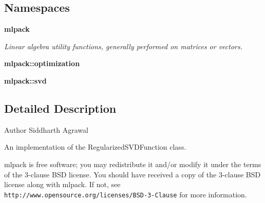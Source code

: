 \subsection*{Namespaces}
\begin{DoxyCompactItemize}
\item 
 {\bf mlpack}
\begin{DoxyCompactList}\small\item\em Linear algebra utility functions, generally performed on matrices or vectors. \end{DoxyCompactList}\item 
 {\bf mlpack\+::optimization}
\item 
 {\bf mlpack\+::svd}
\end{DoxyCompactItemize}


\subsection{Detailed Description}
\begin{DoxyAuthor}{Author}
Siddharth Agrawal
\end{DoxyAuthor}
An implementation of the Regularized\+S\+V\+D\+Function class.

mlpack is free software; you may redistribute it and/or modify it under the terms of the 3-\/clause B\+SD license. You should have received a copy of the 3-\/clause B\+SD license along with mlpack. If not, see {\tt http\+://www.\+opensource.\+org/licenses/\+B\+S\+D-\/3-\/\+Clause} for more information. 